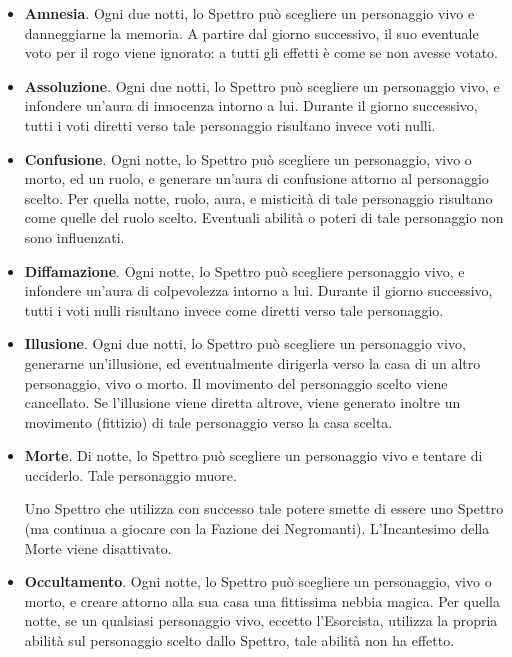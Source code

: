 \documentclass[a4paper,10pt]{article}
\begin{document}
\begin{itemize}

	\item {\bf Amnesia}. Ogni due notti, lo Spettro può scegliere un personaggio vivo e danneggiarne la memoria. A partire dal giorno successivo, il suo eventuale voto per il rogo viene ignorato: a tutti gli effetti è come se non avesse votato.
 
	\item {\bf Assoluzione}. Ogni due notti, lo Spettro può scegliere un personaggio vivo, e infondere un'aura di innocenza intorno a lui. Durante il giorno successivo, tutti i voti diretti verso tale personaggio risultano invece voti nulli.
	
	\item {\bf Confusione}. Ogni notte, lo Spettro può scegliere un personaggio, vivo o morto, ed un ruolo, e generare un'aura di confusione attorno al personaggio scelto. Per quella notte, ruolo, aura, e misticità di tale personaggio risultano come quelle del ruolo scelto. Eventuali abilità o poteri di tale personaggio non sono influenzati.

	\item {\bf Diffamazione}. Ogni notte, lo Spettro può scegliere personaggio vivo, e infondere un'aura di colpevolezza intorno a lui. Durante il giorno successivo, tutti i voti nulli risultano invece come diretti verso tale personaggio.
	
	\item {\bf Illusione}. Ogni due notti, lo Spettro può scegliere un personaggio vivo, generarne un'illusione, ed eventualmente dirigerla verso la casa di un altro personaggio, vivo o morto. Il movimento del personaggio scelto viene cancellato. Se l'illusione viene diretta altrove, viene generato inoltre un movimento (fittizio) di tale personaggio verso la casa scelta.
	
	\item {\bf Morte}. Di notte, lo Spettro può scegliere un personaggio vivo e tentare di ucciderlo. Tale personaggio muore.
	
	Uno Spettro che utilizza con successo tale potere smette di essere uno Spettro (ma continua a giocare con la Fazione dei Negromanti). L'Incantesimo della Morte viene disattivato.
 
	\item {\bf Occultamento}. Ogni notte, lo Spettro può scegliere un personaggio, vivo o morto, e creare attorno alla sua casa una fittissima nebbia magica. Per quella notte, se un qualsiasi personaggio vivo, eccetto l'Esorcista, utilizza la propria abilità sul personaggio scelto dallo Spettro, tale abilità non ha effetto.
	

\end{itemize}
\end{document}
